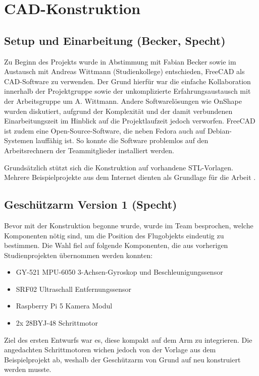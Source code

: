 \chapter{CAD-Konstruktion}

\section{Setup und Einarbeitung (Becker, Specht)}

Zu Beginn des Projekts wurde in Abstimmung mit Fabian Becker sowie im Austausch mit Andreas Wittmann (Studienkollege) entschieden, FreeCAD als CAD-Software zu verwenden. Der Grund hierfür war die einfache Kollaboration innerhalb der Projektgruppe sowie der unkomplizierte Erfahrungsaustausch mit der Arbeitsgruppe um A. Wittmann. Andere Softwarelösungen wie OnShape wurden diskutiert, aufgrund der Komplexität und der damit verbundenen Einarbeitungszeit im Hinblick auf die Projektlaufzeit jedoch verworfen. FreeCAD ist zudem eine Open-Source-Software, die neben Fedora auch auf Debian-Systemen lauffähig ist. So konnte die Software problemlos auf den Arbeitsrechnern der Teammitglieder installiert werden.

Grundsätzlich stützt sich die Konstruktion auf vorhandene STL-Vorlagen. Mehrere Beispielprojekte aus dem Internet dienten als Grundlage für die Arbeit \cite{cad_turret_blueprint,cad_flywheel_blueprint,cad_esp_case_blueprint}.

\section{Geschützarm Version 1 (Specht) \label{sec:cad_gunarm_v1}}

Bevor mit der Konstruktion begonne wurde, wurde im Team besprochen, welche Komponenten nötig sind, um die Position des Flugobjekts eindeutig zu bestimmen. Die Wahl fiel auf folgende Komponenten, die aus vorherigen Studienprojekten übernommen werden konnten:

\begin{itemize}
    \item GY-521 MPU-6050 3-Achsen-Gyroskop und Beschleunigungssensor
    \item SRF02 Ultraschall Entfernungssensor
    \item Raspberry Pi 5 Kamera Modul
    \item 2x 28BYJ-48 Schrittmotor
\end{itemize}

Ziel des ersten Entwurfs war es, diese kompakt auf dem Arm zu integrieren. Die angedachten Schrittmotoren wichen jedoch von der Vorlage aus dem Beispielprojekt \cite{cad_turret_blueprint} ab, weshalb der Geschützarm von Grund auf neu konstruiert werden musste.

